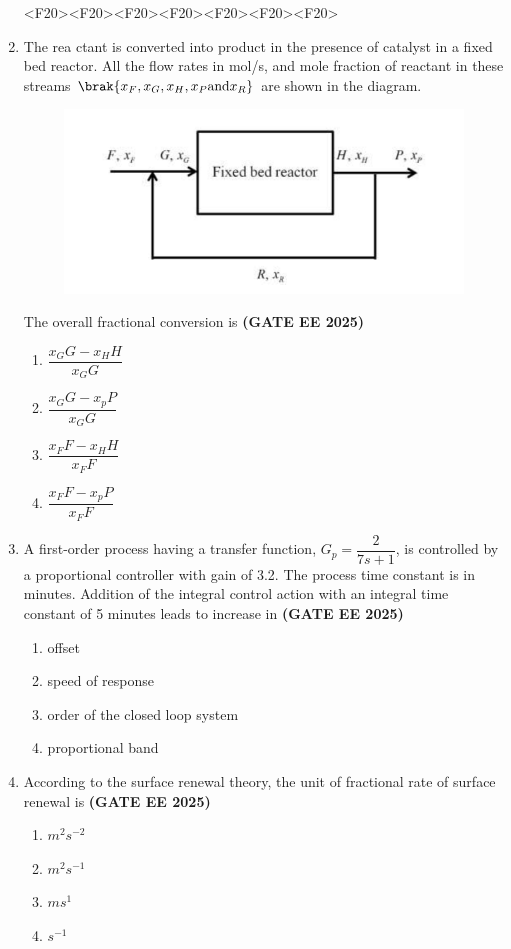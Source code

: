 \documentclass[journal,12pt,onecolumn]{IEEEtran}
\theoremstyle{remark}
\begin{document}
\begin{enumerate}
<F20><F20><F20><F20><F20><F20><F20>
\item  The rea
ctant is converted into product  in the presence of catalyst in a fixed bed reactor. All the flow rates  in mol/s, and mole fraction of reactant  in these streams $\brak{x_F, x_G, x_H, x_P \text{and} x_R}$ are shown in the diagram.
\begin{figure}
\begin{center}
\includegraphics[width=0.7\columnwidth]{figs/17.png}
      \caption{}
      \label{fig17}
\end{center}
\end{figure}
The overall fractional conversion is
\hfill \textbf{(GATE EE 2025)} \begin{enumerate}
    \item $\dfrac{x_{G}G-x_{H}H}{x_{G}G}$
    \item $\dfrac{x_{G}G-x_{p}P}{x_{G}G}$
    \item $\dfrac{x_{F}F-x_{H}H}{x_{F}F}$
    \item $\dfrac{x_{F}F-x_{p}P}{x_{F}F}$
\end{enumerate}


\item A first-order process having a transfer function, $G_{p}=\dfrac{2}{7s+1}$, is controlled by a proportional controller with gain of 3.2. The process time constant is in minutes. Addition of the integral control action with an integral time constant of 5 minutes leads to increase in
\hfill \textbf{(GATE EE 2025)} \begin{enumerate}
    \item offset
    \item speed of response
    \item order of the closed loop system
    \item proportional band
\end{enumerate}


\item According to the surface renewal theory, the unit of fractional rate of surface renewal is
\hfill \textbf{(GATE EE 2025)} \begin{enumerate}
    \item $m^{2}s^{-2}$
    \item $m^{2}s^{-1}$
    \item $ms^{1}$
    \item $s^{-1}$
\end{enumerate}



\end{enumerate}
\end{document}
